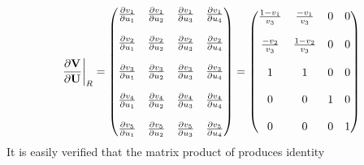 \begin{equation}
  \pdr{\mv}{\mU}{R} = 
  \begin{pmatrix}
    \pd{v_1}{u_1} & \pd{v_1}{u_2} & \pd{v_1}{u_3} & \pd{v_1}{u_4} \\ \\
    \pd{v_2}{u_1} & \pd{v_2}{u_2} & \pd{v_2}{u_3} & \pd{v_2}{u_4} \\ \\
    \pd{v_3}{u_1} & \pd{v_3}{u_2} & \pd{v_3}{u_3} & \pd{v_3}{u_4} \\ \\
    \pd{v_4}{u_1} & \pd{v_4}{u_2} & \pd{v_4}{u_3} & \pd{v_4}{u_4} \\ \\
    \pd{v_5}{u_1} & \pd{v_5}{u_2} & \pd{v_5}{u_3} & \pd{v_5}{u_4} 
  \end{pmatrix}
  =
  \begin{pmatrix}
    \frac{1-v_1}{v_3} & \frac{-v_1}{v_3}  & 0 & 0 \\ \\
    \frac{-v_2}{v_3}  & \frac{1-v_2}{v_3} & 0 & 0 \\ \\
    1                 & 1                 & 0 & 0 \\ \\
    0                 & 0                 & 1 & 0 \\ \\
    0                 & 0                 & 0 & 1
  \end{pmatrix}
  \label{dvdu-jac-right}
\end{equation}
It is easily verified that the matrix product of
 produces identity
